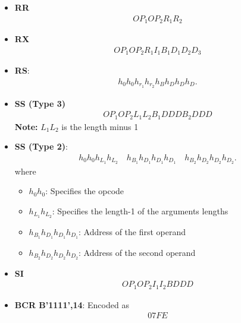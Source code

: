 \documentclass{report}
\begin{document}
    \pagebreak 
    \begin{itemize}
        \item \textbf{RR}
            \begin{align*}
                OP_{1}OP_{2}R_{1}R_{2}
            \end{align*}
        \item \textbf{RX}
            \begin{align*}
                OP_{1}OP_{2}R_{1}I_{1}B_{1}D_{1}D_{2}D_{3}
            \end{align*}
        \item \textbf{RS}:
            \begin{align*}
                h_{0}h_{0}h_{r_{1}}h_{r_{2}}h_{B}h_{D}h_{D}h_{D}
            .\end{align*}


        \item \textbf{SS (Type 3)}
            \begin{align*}
                OP_{1}OP_{2}L_{1}L_{2}B_{1}DDDB_{2}DDD
            \end{align*}
            \textbf{Note:} $L_{1}L_{2}$ is the length minus 1
        \item \textbf{SS (Type 2)}:
            \begin{align*}
                h_{0}h_{0}h_{L_{1}}h_{L_{2}} \quad h_{B_{1}}h_{D_{1}}h_{D_{1}}h_{D_{1}} \quad h_{B_{2}}h_{D_{2}}h_{D_{2}}h_{D_{2}}
            .\end{align*}
            where 
            \begin{itemize}
                \item \textbf{$h_{0}h_{0}$}: Specifies the opcode
                \item \textbf{$h_{L_{1}}h_{L_{2}}$}: Specifies the length-1 of the arguments lengths
                \item \textbf{$h_{B_{1}}h_{D_{1}}h_{D_{1}}h_{D_{1}} $}: Address of the first operand
                \item \textbf{$h_{B_{2}}h_{D_{2}}h_{D_{2}}h_{D_{2}} $}: Address of the second operand
            \end{itemize}

        \item \textbf{SI}
            \begin{align*}
                OP_{1}OP_{2}I_{1}I_{2}BDDD
            \end{align*}
        \item \textbf{BCR B'1111',14}: Encoded as
            \begin{align*}
                07FE
            \end{align*}
    \end{itemize}


    \pagebreak 
    \bigbreak \noindent 

    \bigbreak \noindent 
\end{document}
